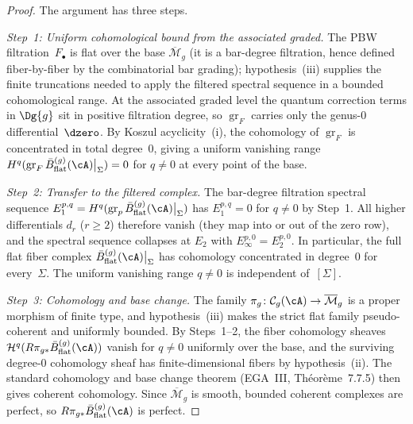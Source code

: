 \begin{proof}
The argument has three steps.

\emph{Step~1: Uniform cohomological bound from the associated graded.}
The PBW filtration~$F_\bullet$ is flat over the base
$\overline{\mathcal{M}}_g$ (it is a bar-degree filtration,
hence defined fiber-by-fiber by the combinatorial bar grading);
hypothesis~(iii) supplies the finite truncations needed to apply the
filtered spectral sequence in a bounded cohomological range.
At the associated graded level the quantum correction terms in
$\Dg{g}$ sit in positive filtration degree, so
$\operatorname{gr}_F$ carries only the genus-$0$
differential~$\dzero$. By Koszul acyclicity~(i), the
cohomology of $\operatorname{gr}_F$ is concentrated in total
degree~$0$, giving a uniform vanishing range
$H^q(\operatorname{gr}_F\bar{B}^{(g)}_{\mathrm{flat}}(\cA)\big|_\Sigma) = 0$
for $q \neq 0$ at every point of the base.

\emph{Step~2: Transfer to the filtered complex.}
The bar-degree filtration spectral sequence
$E_1^{p,q} =
H^q(\operatorname{gr}_p\bar{B}^{(g)}_{\mathrm{flat}}(\cA)\big|_\Sigma)$
has $E_1^{p,q} = 0$ for $q \neq 0$ by Step~1. All higher
differentials $d_r$ ($r \geq 2$) therefore vanish (they map into
or out of the zero row), and the spectral sequence collapses at
$E_2$ with $E_\infty^{p,0} = E_2^{p,0}$. In particular, the
full flat fiber complex $\bar{B}^{(g)}_{\mathrm{flat}}(\cA)\big|_\Sigma$ has
cohomology concentrated in degree~$0$ for every~$\Sigma$.
The uniform vanishing range $q \neq 0$ is independent
of~$[\Sigma]$.

\emph{Step~3: Cohomology and base change.}
The family
$\pi_g\colon \mathcal{C}_g(\cA) \to \overline{\mathcal{M}}_g$
is a proper morphism of finite type, and hypothesis~(iii) makes the
strict flat family pseudo-coherent and uniformly bounded. By
Steps~1--2, the fiber
cohomology sheaves
$\mathcal{H}^q(R\pi_{g*}\bar{B}^{(g)}_{\mathrm{flat}}(\cA))$ vanish for
$q \neq 0$ uniformly over the base, and the surviving
degree-$0$ cohomology sheaf has
finite-dimensional fibers by hypothesis~(ii). The standard
cohomology and base change theorem
(EGA~III, Th\'eor\`eme~7.7.5)
then gives coherent cohomology. Since
$\overline{\mathcal{M}}_g$ is smooth, bounded coherent complexes are
perfect, so $R\pi_{g*}\bar{B}^{(g)}_{\mathrm{flat}}(\cA)$ is perfect.
\end{proof}

